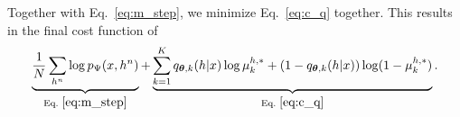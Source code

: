 \documentclass{article}
\newcommand{\vects}[1]{\boldsymbol{#1}}
\newcommand{\TT}[0]{\vects{\theta}}
\begin{document}
Together with Eq.~\eqref{eq:m_step}, we minimize Eq.~\eqref{eq:c_q} together. This
results in the final cost function of
\begin{align*}
    \underbrace{\frac{1}{N} \sum_{h^n} \log p_{\Psi}(x,h^n)}_{\text{Eq.~}\eqref{eq:m_step}} + 
    \underbrace{\sum_{k=1}^K q_{\TT,k}(h|x) \log \mu^{h,*}_k + 
    (1 - q_{\TT,k}(h|x)) \log (1 - \mu^{h,*}_k)}_{\text{Eq.~}\eqref{eq:c_q}}.
\end{align*}













%
%
\end{document}
